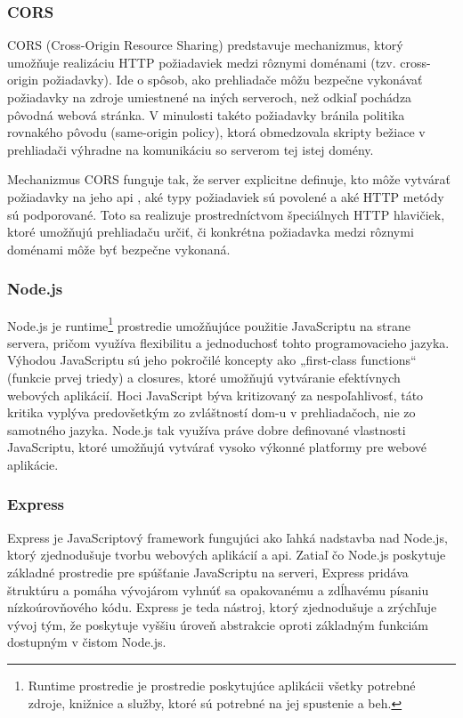 \subsubsection{CORS}
CORS (Cross-Origin Resource Sharing) predstavuje mechanizmus, ktorý umožňuje realizáciu HTTP požiadaviek medzi rôznymi doménami (tzv. cross-origin požiadavky).
 Ide o spôsob, ako prehliadače môžu bezpečne vykonávať požiadavky na zdroje umiestnené na iných serveroch, než odkiaľ pochádza pôvodná webová stránka. 
 V minulosti takéto požiadavky bránila politika rovnakého pôvodu (same-origin policy), ktorá obmedzovala skripty bežiace v prehliadači výhradne na komunikáciu so serverom tej istej domény.

Mechanizmus CORS funguje tak, že server explicitne definuje, kto môže vytvárať požiadavky na jeho \acrshort{api}
, aké typy požiadaviek sú povolené a aké HTTP metódy sú podporované.
 Toto sa realizuje prostredníctvom špeciálnych HTTP hlavičiek, ktoré umožňujú prehliadaču určiť, či konkrétna požiadavka medzi rôznymi doménami môže byť bezpečne vykonaná.
 \cite{CORS}
\subsubsection{Node.js}
Node.js je runtime\footnote{Runtime prostredie je prostredie poskytujúce aplikácii všetky potrebné zdroje, knižnice a služby, ktoré sú potrebné na jej spustenie a beh.}
prostredie umožňujúce použitie JavaScriptu na strane servera, pričom využíva flexibilitu a jednoduchosť tohto programovacieho jazyka.
 Výhodou JavaScriptu sú jeho pokročilé koncepty ako „first-class functions“ (funkcie prvej triedy) a closures, ktoré umožňujú vytváranie efektívnych webových aplikácií. 
 Hoci JavaScript býva kritizovaný za nespoľahlivosť, táto kritika vyplýva predovšetkým zo zvláštností \acrshort{dom}-u v prehliadačoch, nie zo samotného jazyka.
 Node.js tak využíva práve dobre definované vlastnosti JavaScriptu, ktoré umožňujú vytvárať vysoko výkonné platformy pre webové aplikácie.\cite{nodejs}
\subsubsection{Express}
Express je JavaScriptový framework fungujúci ako ľahká nadstavba nad Node.js, ktorý zjednodušuje tvorbu webových aplikácií a \acrshort{api}. Zatiaľ čo Node.js poskytuje základné prostredie pre spúšťanie JavaScriptu na serveri, Express pridáva štruktúru a pomáha vývojárom vyhnúť sa opakovanému a zdĺhavému písaniu nízkoúrovňového kódu. Express je teda nástroj, ktorý zjednodušuje a zrýchľuje vývoj tým, že poskytuje vyššiu úroveň abstrakcie oproti základným funkciám dostupným v čistom Node.js.


